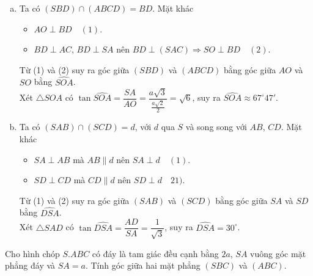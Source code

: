 \begin{vd}
{\begin{enumerate}[a)]
			\item Ta có $(SBD) \cap (ABCD)=BD$. Mặt khác 
			\begin{itemize}
				\item [$\bullet$] $AO \perp BD \quad (1)$.
				\item [$\bullet$] $BD \perp AC$, $BD \perp SA$ nên $BD \perp (SAC) \Rightarrow SO \perp BD \quad (2)$.
			\end{itemize}
			Từ (1) và (2) suy ra góc giữa $(SBD)$ và $(ABCD)$ bằng góc giữa $AO$ và $SO$ bằng $\widehat{SOA}$.\\
			Xét $\triangle SOA$ có $\tan \widehat{SOA}=\dfrac{SA}{AO}=\dfrac{a\sqrt{3}}{\tfrac{a\sqrt{2}}{2}}=\sqrt{6}$, suy ra $\widehat{SOA}\approx 67^\circ47'$.
			\item Ta có $(SAB) \cap (SCD)=d$, với $d$ qua $S$ và song song với $AB$, $CD$. Mặt khác 
			\begin{itemize}
				\item [$\bullet$] $SA \perp AB$ mà $AB \parallel d$ nên $SA \perp d \quad (1)$.
				\item [$\bullet$] $SD \perp CD$ mà $CD \parallel d$ nên $SD \perp d \quad 21)$.
			\end{itemize}
			Từ (1) và (2) suy ra góc giữa $(SAB)$ và $(SCD)$ bằng góc giữa $SA$ và $SD$ bằng $\widehat{DSA}$.\\
			Xét $\triangle SAD$ có $\tan \widehat{DSA}=\dfrac{AD}{SA}=\dfrac{1}{\sqrt{3}}$, suy ra $\widehat{DSA}=30^\circ$.
	\end{enumerate}}
\end{vd}

\begin{vd}
	Cho hình chóp $S. ABC$  có đáy là tam giác đều cạnh bằng $2a $, $SA$ vuông góc mặt phẳng đáy và
	$SA =a $. Tính góc giữa hai mặt phẳng $(SBC)$ và $(ABC)$.
\end{vd}

